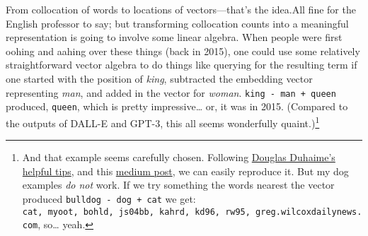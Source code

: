 \documentclass[
  12pt,
]{article}
\begin{document}
From collocation of words to locations of vectors---that's the idea.{All
fine for the English professor to say; but transforming collocation
counts into a meaningful representation is going to involve some linear
algebra.} When people were first oohing and aahing over these things
(back in 2015), one could use some relatively straightforward vector
algebra to do things like querying for the resulting term if one started
with the position of \emph{king}, subtracted the embedding vector
representing \emph{man}, and added in the vector for \emph{woman}.
\texttt{king\ -\ man\ +\ queen} produced, \texttt{queen}, which is
pretty impressive\ldots{} or, it was in 2015. (Compared to the outputs
of DALL-E and GPT-3, this all seems wonderfully quaint.)\footnote{And
  that example seems carefully chosen. Following
  \href{https://douglasduhaime.com/posts/clustering-semantic-vectors.html}{Douglas
  Duhaime's helpful tips}, and this
  \href{https://medium.com/analytics-vidhya/basics-of-using-pre-trained-glove-vectors-in-python-d38905f356db}{medium
  post}, we can easily reproduce it. But my dog examples \emph{do not}
  work. If we try something the words nearest the vector produced
  \texttt{bulldog\ -\ dog\ +\ cat} we get:
  \texttt{\textquotesingle{}cat\textquotesingle{},\ \textquotesingle{}myoot\textquotesingle{},\ \textquotesingle{}bohld\textquotesingle{},\ \textquotesingle{}js04bb\textquotesingle{},\ \textquotesingle{}kahrd\textquotesingle{},\ \textquotesingle{}kd96\textquotesingle{},\ \textquotesingle{}rw95\textquotesingle{},\ \textquotesingle{}greg.wilcoxdailynews.com\textquotesingle{}},
  so\ldots{} yeah.}
\end{document}
